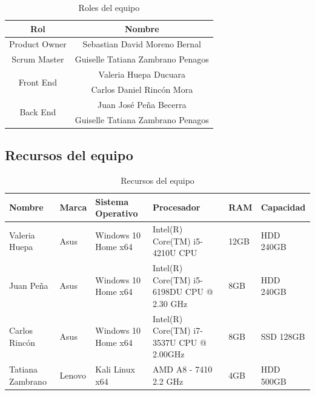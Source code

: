 \documentclass[a4paper,12 pt]{article}
\begin{document}
\begin{table}[H]
    \centering
    \small{
    \begin{tabular}{|c|c|}
        \hline
        \textbf{Rol}   &   \textbf{Nombre}  \\ 
        \hline
        Product Owner   &   Sebastian David Moreno Bernal\\
        \hline
        Scrum Master   &   Guiselle Tatiana Zambrano Penagos\\
        \hline
        \multirow{2}{2cm}{Front End}    &   Valeria Huepa Ducuara\\
            &   Carlos Daniel Rincón Mora\\
        \hline
        \multirow{2}{2cm}{Back End}    &   Juan José Peña Becerra\\
            &   Guiselle Tatiana Zambrano Penagos\\
        \hline
         
    \end{tabular}
    \caption{Roles del equipo}}
    \label{T00}
\end{table}{}

\subsection{Recursos del equipo}

\begin{table}[H]
    \centering
    \small{
    \begin{tabular}{|M{2cm}|M{1.5cm}|M{3cm}|M{3cm}|M{1.5cm}|M{2cm}|}
        \hline
        \textbf{Nombre}    &\textbf{Marca}     &\textbf{Sistema Operativo} 
        &\textbf{Procesador}   &\textbf{RAM}   &\textbf{Capacidad}\\
        \hline
        Valeria Huepa                       &Asus   &Windows 10 Home x64 
        & Intel(R) Core(TM) i5-4210U CPU    &12GB   &HDD 240GB \\
        \hline
        Juan Peña                           &Asus   &Windows 10 Home x64
        &Intel(R) Core(TM) i5-6198DU CPU @ 2.30 GHz &8GB    &HDD 240GB\\
        \hline
        Carlos Rincón                       &Asus   &Windows 10 Home x64
        &Intel(R) Core(TM) i7-3537U CPU @ 2.00GHz   &8GB    &SSD 128GB\\
        \hline
        Tatiana Zambrano                    &Lenovo &Kali Linux x64
        &AMD A8 - 7410 2.2 GHz              &4GB    &HDD 500GB\\
        \hline
    \end{tabular}
    \caption{Recursos del equipo}
    \label{T01}}
\end{table}{}
\end{document}
